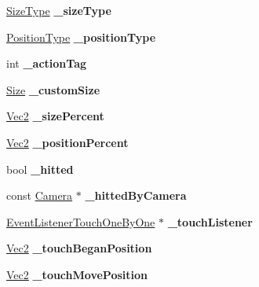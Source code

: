 \begin{DoxyCompactItemize}
\hyperlink{classui_1_1Widget_ab7035fc10a00c756523be6bc57cf801c}{Size\+Type} {\bfseries \+\_\+size\+Type}
\item 
\mbox{\label{classui_1_1Widget_a12efe5c7fad3640bc68768545b9aac94}} 
\hyperlink{classui_1_1Widget_acfb8004ec169575dab6d3e8eb3e92b90}{Position\+Type} {\bfseries \+\_\+position\+Type}
\item 
\mbox{\label{classui_1_1Widget_afca95e1e18a67e579e05c7a22027fd35}} 
int {\bfseries \+\_\+action\+Tag}
\item 
\mbox{\label{classui_1_1Widget_a2a76b50358853e335796f5932a24322b}} 
\hyperlink{classSize}{Size} {\bfseries \+\_\+custom\+Size}
\item 
\mbox{\label{classui_1_1Widget_af8962ea31e335a441b283ceae6dfe36a}} 
\hyperlink{classVec2}{Vec2} {\bfseries \+\_\+size\+Percent}
\item 
\mbox{\label{classui_1_1Widget_acdaa60c4fa58bef17463e22114d340c4}} 
\hyperlink{classVec2}{Vec2} {\bfseries \+\_\+position\+Percent}
\item 
\mbox{\label{classui_1_1Widget_a24201a1b3c3509ab3e5f503e6a7b9ffe}} 
bool {\bfseries \+\_\+hitted}
\item 
\mbox{\label{classui_1_1Widget_ac056d59ab9fa23e1e7611f1cebe7a01f}} 
const \hyperlink{classCamera}{Camera} $\ast$ {\bfseries \+\_\+hitted\+By\+Camera}
\item 
\mbox{\label{classui_1_1Widget_ab906d4a2beb0945e6f196549b0593d24}} 
\hyperlink{classEventListenerTouchOneByOne}{Event\+Listener\+Touch\+One\+By\+One} $\ast$ {\bfseries \+\_\+touch\+Listener}
\item 
\mbox{\label{classui_1_1Widget_a9ecf00b8481036112b5a0e3ced487f94}} 
\hyperlink{classVec2}{Vec2} {\bfseries \+\_\+touch\+Began\+Position}
\item 
\mbox{\label{classui_1_1Widget_a5ca9f3fcba00e44efb0352bdbed39d91}} 
\hyperlink{classVec2}{Vec2} {\bfseries \+\_\+touch\+Move\+Position}

\end{DoxyCompactItemize}
